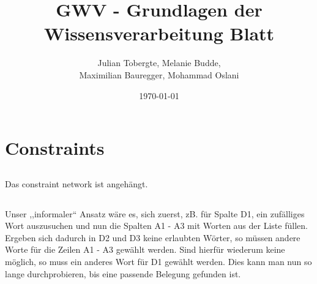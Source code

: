 \documentclass[DIV=calc,numbers=noenddot]{scrartcl}
\title{GWV - Grundlagen der Wissensverarbeitung Blatt \arabic{blatt}}
\author{Julian Tobergte, Melanie Budde,\\Maximilian Bauregger, Mohammad Oslani}
\date{\today}
\begin{document}
	\maketitle
	\section{Constraints}
		\subsection{}
			Das constraint network ist angehängt.
		\subsection{}
			Unser ,,informaler`` Ansatz wäre es, sich zuerst, zB. für Spalte D1,  ein zufälliges Wort auszusuchen und nun die Spalten A1 - A3 mit Worten aus der Liste füllen. Ergeben sich dadurch in D2 und D3 keine erlaubten Wörter, so müssen andere Worte für die Zeilen A1 - A3 gewählt werden. Sind hierfür wiederum keine möglich, so muss ein anderes Wort für D1 gewählt werden. Dies kann man nun so lange durchprobieren, bis eine passende Belegung gefunden ist.
\end{document}
